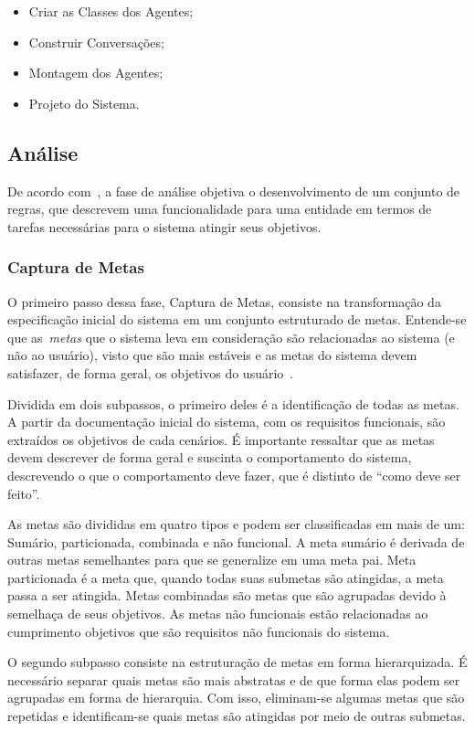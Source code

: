 \begin{itemize}
	\item Criar as Classes dos Agentes;
	\item Construir Conversações;
	\item Montagem dos Agentes;
	\item Projeto do Sistema.
\end{itemize}

\subsection{Análise}

De acordo com~\cite{scott01}, a fase de análise objetiva o desenvolvimento de um conjunto de regras, que descrevem uma funcionalidade para uma entidade em termos de tarefas necessárias para o sistema atingir seus objetivos.

\subsubsection{Captura de Metas}

O primeiro passo dessa fase, Captura de Metas, consiste na transformação da especificação inicial do sistema em um conjunto estruturado de metas. Entende-se que as~\emph{metas} que o sistema leva em consideração são relacionadas ao sistema (e não ao usuário), visto que são mais estáveis e as metas do sistema devem satisfazer, de forma geral, os objetivos do usuário~\cite{scott01}.

Dividida em dois subpassos, o primeiro deles é a identificação de todas as metas. A partir da documentação inicial do sistema, com os requisitos  funcionais, são extraídos os objetivos de cada cenários. É importante ressaltar que as metas devem descrever de forma geral e suscinta o comportamento do sistema, descrevendo o que o comportamento deve fazer, que é distinto de ``como deve ser feito''.

As metas são divididas em quatro tipos e podem ser classificadas em mais de um: Sumário, particionada, combinada e não funcional. A meta sumário é derivada de outras metas semelhantes para que se generalize em uma meta pai. Meta particionada é a meta que, quando todas suas submetas são atingidas,  a meta passa a ser atingida. Metas combinadas são metas que são agrupadas devido à semelhaça de seus objetivos. As metas não funcionais estão relacionadas ao cumprimento objetivos que são requisitos não funcionais do sistema.

O segundo subpasso consiste na estruturação de metas em forma hierarquizada. É necessário separar quais metas são mais abstratas e de que forma elas podem ser agrupadas em forma de hierarquia. Com isso, eliminam-se algumas metas que são repetidas e identificam-se quais metas são atingidas por meio de outras submetas.

